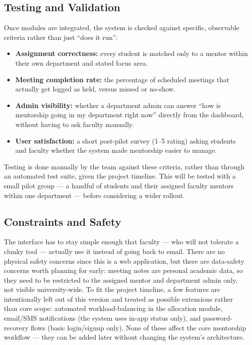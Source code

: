 \documentclass[11pt]{article}
\begin{document}
\subsection{Testing and Validation}
Once modules are integrated, the system is checked against specific, observable criteria rather than just ``does it run'':
\begin{itemize}[leftmargin=1.4em, itemsep=0.2em]
  \item \textbf{Assignment correctness:} every student is matched only to a mentor within their own department and stated focus area.
  \item \textbf{Meeting completion rate:} the percentage of scheduled meetings that actually get logged as held, versus missed or no-show.
  \item \textbf{Admin visibility:} whether a department admin can answer ``how is mentorship going in my department right now'' directly from the dashboard, without having to ask faculty manually.
  \item \textbf{User satisfaction:} a short post-pilot survey (1--5 rating) asking students and faculty whether the system made mentorship easier to manage.
\end{itemize}
Testing is done manually by the team against these criteria, rather than through an automated test suite, given the project timeline. This will be tested with a small pilot group --- a handful of students and their assigned faculty mentors within one department --- before considering a wider rollout.

\subsection{Constraints and Safety}
The interface has to stay simple enough that faculty --- who will not tolerate a clunky tool --- actually use it instead of going back to email. There are no physical safety concerns since this is a web application, but there are data-safety concerns worth planning for early: meeting notes are personal academic data, so they need to be restricted to the assigned mentor and department admin only, not visible university-wide. To fit the project timeline, a few features are intentionally left out of this version and treated as possible extensions rather than core scope: automated workload-balancing in the allocation module, email/SMS notifications (the system uses in-app status only), and password-recovery flows (basic login/signup only). None of these affect the core mentorship workflow --- they can be added later without changing the system's architecture.
\end{document}
